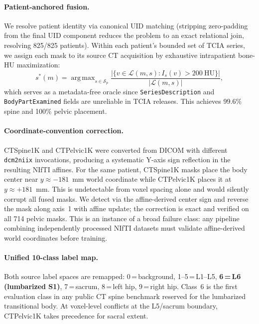 \documentclass{article}
\DeclareMathOperator*{\argmax}{arg\,max}
\begin{document}
\paragraph{Patient-anchored fusion.}
We resolve patient identity via canonical UID matching (stripping
zero-padding from the final UID component reduces the problem to
an exact relational join, resolving 825/825 patients).
Within each patient's bounded set of TCIA series, we assign each
mask to its source CT acquisition by exhaustive intrapatient
bone-HU maximization:
\begin{equation}
s^*(m) = \argmax_{s \in \mathcal{S}_p}
\frac{|\{v \in \mathcal{L}(m, s) : I_s(v) > 200~\text{HU}\}|}{|\mathcal{L}(m, s)|},
\label{eq:bonehu}
\end{equation}
which serves as a metadata-free oracle since
\texttt{SeriesDescription} and \texttt{BodyPartExamined} fields
are unreliable in TCIA releases.
This achieves 99.6\% spine and 100\% pelvic placement.

\paragraph{Coordinate-convention correction.}
CTSpine1K and CTPelvic1K were converted from DICOM with different
\texttt{dcm2niix} invocations, producing a systematic Y-axis sign
reflection in the resulting NIfTI affines.
For the same patient, CTSpine1K masks place the body center near
$y \approx -181$~mm world coordinate while CTPelvic1K places it
at $y \approx +181$~mm.
This is undetectable from voxel spacing alone and would silently
corrupt all fused masks. We detect via the affine-derived center
sign and reverse the mask along axis~1 with affine update; the
correction is exact and verified on all 714 pelvic masks.
This is an instance of a broad failure class: any pipeline
combining independently processed NIfTI datasets must validate
affine-derived world coordinates before training.

\paragraph{Unified 10-class label map.}
Both source label spaces are remapped:
0\,=\,background, 1--5\,=\,L1--L5,
\textbf{6\,=\,L6 (lumbarized S1)}, 7\,=\,sacrum,
8\,=\,left hip, 9\,=\,right hip.
Class~6 is the first evaluation class in any public CT spine
benchmark reserved for the lumbarized transitional body.
At voxel-level conflicts at the L5/sacrum boundary, CTPelvic1K
takes precedence for sacral extent.
\end{document}

